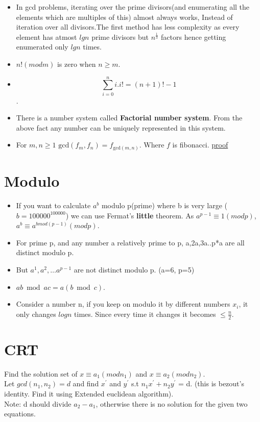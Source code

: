 \documentclass[../Notes.tex]{subfiles}
\begin{document}
\begin{itemize}
	\item In gcd problems, iterating over the prime divisors(and enumerating all the elements which are multiples of this) almost always works, Instead of iteration over all divisors.The first method has less complexity as every element has atmost $lgn$ prime divisors but $n^\frac{1}{3}$ factors hence getting enumerated only $lgn$ times.
	\item $n!(mod m)$ is zero when $n\geq m$.
	\item $$\sum_{i=0}^{n}i.i!=(n+1)!-1$$. 
	\item There is a number system called \textbf{Factorial number system}.
	From the above fact any number can be uniquely represented in this system.
	\item For $m,n\ge 1$ $\mbox{gcd}(f_{m},f_{n})=f_{\text{gcd}(m,n)}$. Where $f$ is fibonacci. \href{./Material/fibonacci gcd.pdf}{proof}
\end{itemize}

\section{Modulo}
\begin{itemize}
	\item If you want to calculate $a^b$ modulo p(prime) where b is very large ($b=100000^{100000}$) we can use Fermat's \textbf{little} theorem. As $a^{p-1}\equiv 1(mod p)$, $a^b\equiv a^{bmod(p-1)}(mod p)$.  
	\item For prime p, and any number a relatively prime to p, a,2a,3a..p*a are all distinct modulo p.
	\item But $a^1,a^2,\dotsc a^{p-1}$ are not distinct modulo p. (a=6, p=5)
	\item $ab \bmod ac = a(b \bmod c)$.
	\item Consider a number n, if you keep on modulo it by different numbers $x_i$, it only changes $logn$ times. Since every time it changes it becomes $\leq \frac{n}{2}$.
\end{itemize}

\section{CRT}
Find the solution set of $x\equiv a_1(mod n_1)$ and $x\equiv a_2(mod n_2)$.\\

Let $gcd(n_1,n_2)=d$ and find $x^\prime$ and $y^\prime$ s.t $n_1x^\prime + n_2y^\prime$ = d. (this is bezout's identity. Find it using Extended euclidean algorithm).\\
Note: d should divide $a_2-a_1$, otherwise there is no solution for the given two equations.
\end{document}
